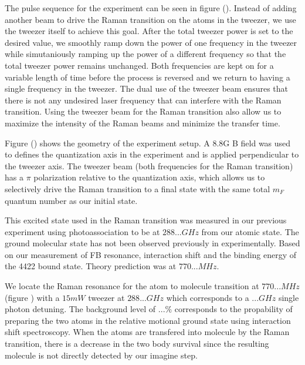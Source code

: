 \documentclass[aps,prl,twocolumn,groupedaddress]{revtex4-1}
\newcommand{\todo}[1]{}
\begin{document}
The pulse sequence for the experiment can be seen in figure (). Instead of adding another beam to drive the Raman transition on the atoms in the tweezer, we use the tweezer itself to achieve this goal. After the total tweezer power is set to the desired value, we smoothly ramp down the power of one frequency in the tweezer while simutaniously ramping up the power of a different frequency so that the total tweezer power remains unchanged. Both frequencies are kept on for a variable length of time before the process is reversed and we return to having a single frequency in the tweezer. The dual use of the tweezer beam ensures that there is not any undesired laser frequency that can interfere with the Raman transition. Using the tweezer beam for the Raman transition also allow us to maximize the intensity of the Raman beams and minimize the transfer time.
\todo{clarify coprop of Raman beam?}

Figure () shows the geometry of the experiment setup. A $8.8\mathrm{G}$ B field was used to defines the quantization axis in the experiment and is applied perpendicular to the tweezer axis. The tweezer beam (both frequencies for the Raman transition) has a $\pi$ polarization relative to the quantization axis, which allows us to selectively drive the Raman transition to a final state with the same total $m_F$ quantum number as our initial state.


This excited state used in the Raman transition was measured in our previous experiment using photoassociation to be at $288... GHz$ from our atomic state. The ground molecular state has not been observed previously in experimentally. Based on our measurement of FB resonance, interaction shift and the binding energy of the 4422 bound state. Theory prediction was at $770... MHz$. \todo{more, mention/cite Jeremy}


We locate the Raman resonance for the atom to molecule transition at $770... MHz$ (figure \todo{}) with a $15 mW$ tweezer at $288... GHz$ which corresponds to a $... GHz$ single photon detuning.
The background level of $...\%$ corresponds to the propability of preparing the two atoms in the relative motional ground state using interaction shift spectroscopy. When the atoms are transfered into molecule by the Raman transition, there is a decrease in the two body survival since the resulting molecule is not directly detected by our imagine step.
\end{document}
